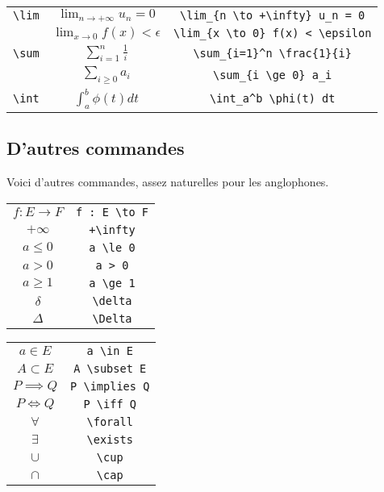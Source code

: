 \documentclass[10pt,class=article,crop=false]{standalone}
\begin{document}
\begin{multicols}{2}
\begin{tabular}{ccc@{\vrule depth 1.2ex height 4ex width 0mm \ }}
	
	\verb?\lim?  &
	$\lim_{n \to + \infty} u_n = 0$ & \verb?\lim_{n \to +\infty} u_n = 0?  \\
	& $\lim_{x \to 0} f(x) < \epsilon$ & \verb?\lim_{x \to 0} f(x) < \epsilon?  \\
	
	\verb?\sum?  &
	$\displaystyle \sum_{i=1}^n \frac{1}{i}$ & \verb?\sum_{i=1}^n \frac{1}{i}? \\
	& $\displaystyle \sum_{i \ge 0} a_i$ & \verb?\sum_{i \ge 0} a_i?  \\
	
	\verb?\int?  &
	$\displaystyle \int_a^b \phi(t) dt$ & \verb?\int_a^b \phi(t) dt?  \\
	
\end{tabular}

\subsection{D'autres commandes}

Voici d'autres commandes, assez naturelles pour les anglophones.

\begin{center}
	\begin{tabular}{cc}
		$f : E \to F$ & \verb?f : E \to F?  \\
		$+\infty$ & \verb?+\infty? \\
		$a \le 0$ & \verb?a \le 0? \\
		$a > 0$ & \verb?a > 0?  \\
		$a \ge 1$ & \verb?a \ge 1? \\
		$\delta$ & \verb?\delta? \\
		$\Delta$ & \verb?\Delta? \\
	\end{tabular}\hspace{2cm}
	\begin{tabular}{cc}
		$a \in E$ & \verb?a \in E? \\
		$A \subset E$ & \verb?A \subset E? \\
		$P \implies Q$ & \verb?P \implies Q? \\
		$P \iff Q$ & \verb?P \iff Q? \\
		$\forall$ & \verb?\forall? \\
		$\exists$ & \verb?\exists? \\
		$\cup$ & \verb?\cup? \\
		$\cap$ & \verb?\cap?  \\
	\end{tabular}
\end{center}


\end{multicols}
\end{document}
